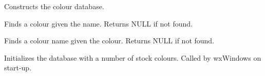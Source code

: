 \label{wxcolourdatabaseconstr}


Constructs the colour database.

\label{wxcolourdatabasefindcolour}


Finds a colour given the name. Returns NULL if not found.

\label{wxcolourdatabasefindname}


Finds a colour name given the colour. Returns NULL if not found.

\label{wxcolourdatabaseinitialize}


Initializes the database with a number of stock colours.  Called by wxWindows
on start-up.


